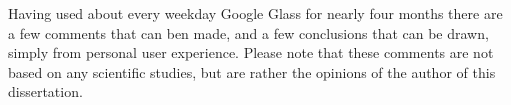 Having used about every weekday Google Glass for nearly four months there are a few comments that can ben made, and a few conclusions that can be drawn, simply from personal user experience. Please note that these comments are not based on any scientific studies, but are rather the opinions of the author of this dissertation.





